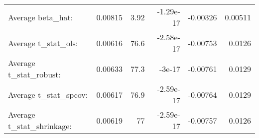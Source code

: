 \begin{tabular}{lrrrrr}
\hline
                           &         &       &           &          &         \\
\hline
 Average beta\_hat:         & 0.00815 &  3.92 & -1.29e-17 & -0.00326 & 0.00511 \\
 Average t\_stat\_ols:       & 0.00616 & 76.6  & -2.58e-17 & -0.00753 & 0.0126  \\
 Average t\_stat\_robust:    & 0.00633 & 77.3  & -3e-17    & -0.00761 & 0.0129  \\
 Average t\_stat\_spcov:     & 0.00617 & 76.9  & -2.59e-17 & -0.00764 & 0.0129  \\
 Average t\_stat\_shrinkage: & 0.00619 & 77    & -2.59e-17 & -0.00757 & 0.0126  \\
\hline
\end{tabular}